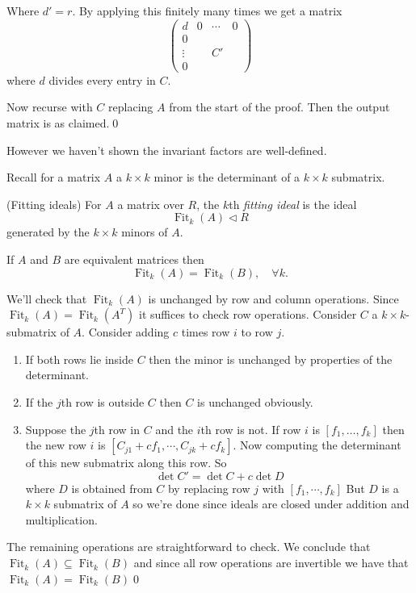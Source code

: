 \documentclass{article}
\newcommand{\nrm}{\triangleleft}
\DeclareMathOperator{\Fit}{Fit}
\begin{document}
Where $ d'=r $. By applying this finitely many times we get a matrix
\[
  \begin{pmatrix}
	  d & 0 & \cdots & 0 \\
	  0 & & & \\
	  \vdots & & C' & \\
	  0 & & &
  \end{pmatrix}
\]
where $ d $ divides every entry in $ C $.\par
Now recurse with $ C $ replacing $ A $ from the start of the proof. Then the output matrix is as claimed.\qed
\begin{remark}
  However we haven't shown the invariant factors are well-defined.
\end{remark}
Recall for a matrix $ A $ a $ k\times k $ minor is the determinant of a $ k\times k $ submatrix.
\begin{definition}
	(Fitting ideals) For $ A $ a matrix over $ R $, the $ k $th \textit{fitting ideal} is the ideal 
	\[
	  \Fit_k(A)\nrm R
	\]
	generated by the $ k\times k $ minors of $ A $.
\end{definition}
\begin{proposition}
  If $ A $ and $ B $ are equivalent matrices then 
  \[
    \Fit_k(A)=\Fit_k(B),\quad \forall k.
  \]
\end{proposition}
\pf We'll check that $ \Fit_k(A) $ is unchanged by row and column operations. Since $ \Fit_k(A)=\Fit_k(A^T) $ it suffices to check row operations. Consider $ C $ a $ k\times k $-submatrix of $ A $. Consider adding $ c $ times row $ i $ to row $ j $.
\begin{enumerate}
	\item If both rows lie inside $ C $ then the minor is unchanged by properties of the determinant.
	\item If the $ j $th row is outside $ C $ then $ C $ is unchanged obviously.
	\item Suppose the $ j $th row in $ C $ and the $ i $th row is not. If row $ i $ is $ [f_1,\dots, f_k] $ then the new row $ i $ is $ [C_{j1}+cf_1,\cdots, C_{jk}+cf_k] $. Now computing the determinant of this new submatrix along this row. So
		\[
		  \det C'=\det C+c\det D
		\]
		where $ D $ is obtained from $ C $ by replacing row $ j $ with $ [f_1,\cdots, f_k] $ But $ D $ is a $ k\times k $ submatrix of $ A $ so we're done since ideals are closed under addition and multiplication.
\end{enumerate}
The remaining operations are straightforward to check. We conclude that $ \Fit_k(A)\subseteq \Fit_k(B) $ and since all row operations are invertible we have that $ \Fit_k(A)=\Fit_k(B) $\qed
\end{document}
